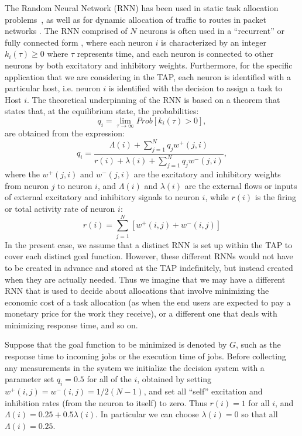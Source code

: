 \documentclass[journal]{IEEEtran}
\begin{document}
The Random Neural Network (RNN) has been used in static task allocation problems~\cite{Gelenbe2010_nearOptAssign}, as well as for dynamic allocation of traffic to routes in packet networks \cite{network1}. The RNN comprised of $N$ neurons is often used in a ``recurrent'' or fully connected form \cite{RNN}, where each neuron $i$ is characterized by an integer $k_i(\tau)\geq 0$ where $\tau$ represents time, and each neuron is connected to other neurons by both excitatory and inhibitory weights. Furthermore, for the specific application that we are considering in the TAP, each neuron is identified with a particular host, i.e. neuron $i$ is identified with the
decision to assign a task to Host $i$. The theoretical underpinning of the RNN \cite{Gelenbe1990_RNN,Gelenbe01112008} is based on a theorem that states that, at the equilibrium state,
the probabilities:
\begin{equation}
q_i=\lim_{\tau\to\infty} Prob[k_i(\tau)>0],
\end{equation}
are obtained from the expression:
\begin{equation}
\label{q}
	q_i = \frac{\Lambda(i)+\sum_{j=1}^Nq_jw^+(j,i)}{r(i)+\lambda(i)+\sum_{j=1}^Nq_jw^-(j,i)},
	\end{equation}
where the $w^+(j,i)$ and $w^-(j,i)$ are the excitatory and inhibitory weights from neuron $j$ to neuron $i$, and
$\Lambda(i)$ and $\lambda(i)$ are the external flows or inputs of external excitatory and inhibitory signals to neuron $i$,
while $r(i)$ is the firing or total activity rate of neuron $i$:
\begin{equation}
r(i) = \sum_{j=1}^{N}[w^+(i, j) + w^-(i, j)]
\label{ri}
\end{equation}
In the present case, we assume that a distinct RNN is set up within the TAP to cover each distinct goal function. However, these
different RNNs would not have to be created in advance and stored at the TAP indefinitely, but instead created when they are actually needed. Thus we imagine that
we may have a different RNN that is used to decide about allocations that involve minimizing the economic cost of a task allocation (as when the end users are expected to pay a monetary price for the work they receive),
or a different one that deals with minimizing response time, and so on. 

Suppose that the goal function to be minimized is denoted by $G$, such as the response time 
to incoming jobs or the execution time of jobs. Before collecting any measurements in the system we initialize the 
decision system with a parameter set  $q_i=0.5$ for all of the $i$, obtained by setting
$w^+(i,j)=w^-(i,j)=1/2(N-1)$, and set all ``self'' excitation and inhibition rates (from the neuron to itself)
to zero. Thus $r(i)=1$ for all $i$, and $\Lambda(i)=0.25+0.5\lambda(i)$. In particular we can choose $\lambda(i)=0$ so that all $\Lambda(i)=0.25$.
\end{document}
